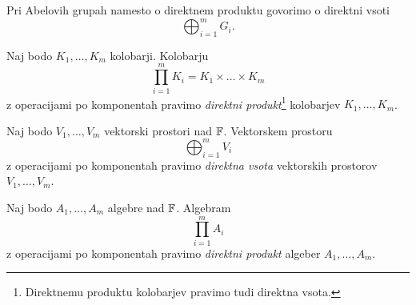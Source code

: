 \begin{opomba}
Pri Abelovih grupah namesto o direktnem produktu govorimo o direktni
vsoti
\[
\bigoplus_{i=1}^m G_i.
\]
\end{opomba}

\begin{definicija}
Naj bodo $K_1, \dots, K_m$ kolobarji. Kolobarju
\[
\prod_{i=1}^m K_i = K_1 \times \dots \times K_m
\]
z operacijami po komponentah pravimo
\emph{direktni produkt}\footnote{
Direktnemu produktu kolobarjev pravimo tudi direktna vsota.} kolobarjev
$K_1, \dots, K_m$.
\end{definicija}

\begin{definicija}
Naj bodo $V_1, \dots, V_m$ vektorski prostori nad $\mathbb{F}$. Vektorskem
prostoru
\[
\bigoplus_{i=1}^m V_i
\]
z operacijami po komponentah pravimo
\emph{direktna vsota}
vektorskih prostorov $V_1, \dots, V_m$.
\end{definicija}

\begin{definicija}
Naj bodo $A_1, \dots, A_m$ algebre nad $\mathbb{F}$. Algebram
\[
\prod_{i=1}^m A_i
\]
z operacijami po komponentah pravimo
\emph{direktni produkt}
algeber $A_1, \dots, A_m$.
\end{definicija}

